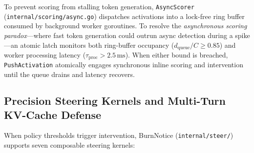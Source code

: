\documentclass{article}
\begin{document}
To prevent scoring from stalling token generation, \texttt{AsyncScorer} (\texttt{internal/scoring/async.go}) dispatches activations into a lock-free ring buffer consumed by background worker goroutines. To resolve the \textit{asynchronous scoring paradox}---where fast token generation could outrun async detection during a spike---an atomic latch monitors both ring-buffer occupancy ($d_{\text{queue}} / C \ge 0.85$) and worker processing latency ($\tau_{\text{proc}} > 2.5\,\text{ms}$). When either bound is breached, \texttt{PushActivation} atomically engages synchronous inline scoring and intervention until the queue drains and latency recovers.

\subsection{Precision Steering Kernels and Multi-Turn KV-Cache Defense}\label{sec:steering}

When policy thresholds trigger intervention, BurnNotice (\texttt{internal/steer/}) supports seven composable steering kernels:
\end{document}

